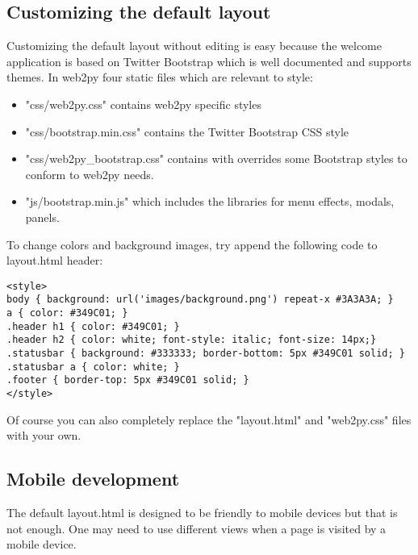 \documentclass[justified,sixbynine,notoc]{tufte-book}
\def\inxx#1{\index{#1}}
\begin{document}
\begin{fullwidth}
\goodbreak\subsection{Customizing the default layout}

\inxx{CSS}

Customizing the default layout without editing is easy because the welcome application is based on Twitter Bootstrap which is well documented and supports themes. In web2py four static files which are relevant to style:

\begin{itemize}
\item "css/web2py.css" contains web2py specific styles

\item "css/bootstrap.min.css" contains the Twitter Bootstrap CSS style~\cite{bootstrap} \inxx{Bootstrap}

\item "css/web2py\_bootstrap.css" contains with overrides some Bootstrap styles to conform to web2py needs.

\item "js/bootstrap.min.js" which includes the libraries for menu effects, modals, panels.
\end{itemize}

To change colors and background images,
try append the following code to layout.html header:

\begin{lstlisting}[keywords={}]
<style>
body { background: url('images/background.png') repeat-x #3A3A3A; }
a { color: #349C01; }
.header h1 { color: #349C01; }
.header h2 { color: white; font-style: italic; font-size: 14px;}
.statusbar { background: #333333; border-bottom: 5px #349C01 solid; }
.statusbar a { color: white; }
.footer { border-top: 5px #349C01 solid; }
</style>
\end{lstlisting}

Of course you can also completely replace the "layout.html" and "web2py.css" files with your own.

\goodbreak\subsection{Mobile development}

The default layout.html is designed to be friendly to mobile devices but that is not enough. One may need to use different views when a page is visited by a mobile device.


\end{fullwidth}
\end{document}
